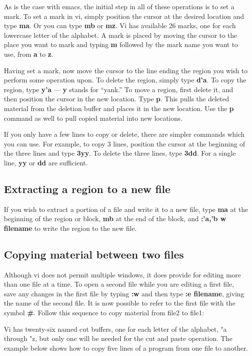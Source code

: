 As is the case with emacs, the initial step in all of these operations is 
to set a mark. To set a mark in vi, simply position the cursor at the
desired location and type {\bf ma}. Or you can type {\bf mb} or {\bf mz}.
Vi has available 26 marks, one for each lowercase letter
of the alphabet. A mark is placed by
moving the cursor to the place you want to mark and typing {\bf m} followed
by the mark name you want to use, from {\bf a} to {\bf z}.

Having set a mark, now move the cursor to the line ending the region you
wish to perform some operation upon. To delete the region, simply type
{\bf d'a}. To copy the region, type {\bf y'a} --- {\bf y} stands for ``yank.''
To move a region, first delete it, and then position the cursor in the 
new location. Type {\bf p}. This pulls the deleted material from the deletion 
buffer and places it in the new location. Use the {\bf p} command as well to
pull copied material into new locations.

If you only have a few lines to copy or delete, there are simpler commands
which you can use. For example, to copy 3 lines, position the cursor at the
beginning of the three lines and type {\bf 3yy}. To delete the three lines, 
type {\bf 3dd}. For a single line, {\bf yy} or {\bf dd} are sufficient.

\subsection{Extracting a region to a new file}

If you wish to extract a portion of a file and write it to a new file,
type {\bf ma} at the beginning of the region or block, {\bf mb} at the 
end of the block, and {\bf :'a,'b w filename} to write the region to the
new file.

\subsection{Copying material between two files}

Although vi does not permit multiple windows, it does provide for editing 
more than one file at a time. To open a second file while you are editing
a first file, save any changes in the first file by typing {\bf :w} and then
type {\bf :e filename}, giving the name of the second file. It is now possible
to refer to the first file with the symbol {\bf \#}. Follow this sequence
to copy material from file2 to file1:

Vi has twenty-six named cut buffers, one for each letter of the alphabet,
"a through "z, but only one will be needed for the cut and paste
operation. The example below shows how to copy five lines of a program
from one file to another.

